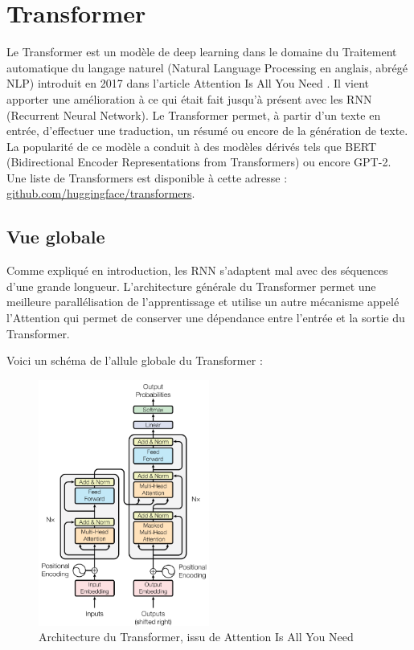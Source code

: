 \newpage

\section{Transformer}

Le \og Transformer \fg{} est un modèle de deep learning dans le domaine du Traitement automatique du langage naturel (Natural Language Processing en anglais, abrégé NLP)
introduit en 2017 dans l'article \og Attention Is All You Need \fg{}\cite{vaswani2017attention}. 
Il vient apporter une amélioration à ce qui était fait jusqu'à présent avec les RNN (Recurrent Neural Network). 
Le Transformer permet, à partir d'un texte en entrée, d'effectuer une traduction, un résumé ou encore de la génération de texte. \\

La popularité de ce modèle a conduit à des modèles dérivés tels que 
BERT (Bidirectional Encoder Representations from Transformers)\cite{devlin2018bert} ou encore GPT-2\cite{radford2019gpt2}.
Une liste de Transformers est disponible à cette adresse : \href{https://github.com/huggingface/transformers}{github.com/huggingface/transformers}.

\subsection{Vue globale}

Comme expliqué en introduction, les RNN s'adaptent mal avec des séquences d'une grande longueur. 
L'architecture générale du Transformer permet une meilleure parallélisation de l'apprentissage et utilise un autre mécanisme appelé \og l'Attention \fg{} qui permet
de conserver une dépendance entre l'entrée et la sortie du Transformer.

Voici un schéma de l'allule globale du Transformer :
\begin{figure}[h]
  \begin{center}
  \includegraphics[width=0.5\textwidth]{img/architecture_transformer.png}
  \end{center}
  \caption{Architecture du Transformer, issu de \og Attention Is All You Need \fg{}\cite{vaswani2017attention}}
  \label{fig:transformer}
\end{figure}


